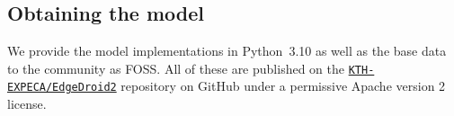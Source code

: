 
\subsection{Obtaining the model}\label{ssec:model:obtaining}

We provide the model implementations in Python~\num{3.10} as well as the base data to the community as \gls{FOSS}.
All of these are published on the \href{https://github.com/KTH-EXPECA/EdgeDroid2}{\texttt{KTH-EXPECA/EdgeDroid2}} repository on GitHub under a permissive Apache version 2 license.
